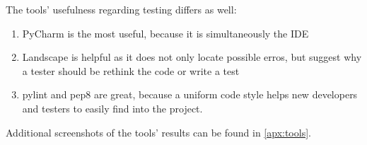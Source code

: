 The tools' usefulness regarding testing differs as well:
\begin{enumerate}
    \item PyCharm is the most useful, because it is simultaneously the IDE
    \item Landscape is helpful as it does not only locate possible erros, but suggest why a tester should be rethink the code or write a test 
    \item pylint and pep8 are great, because a uniform code style helps new developers and testers to easily find into the project. 
\end{enumerate}

Additional screenshots of the tools' results can be found in \autoref{apx:tools}.